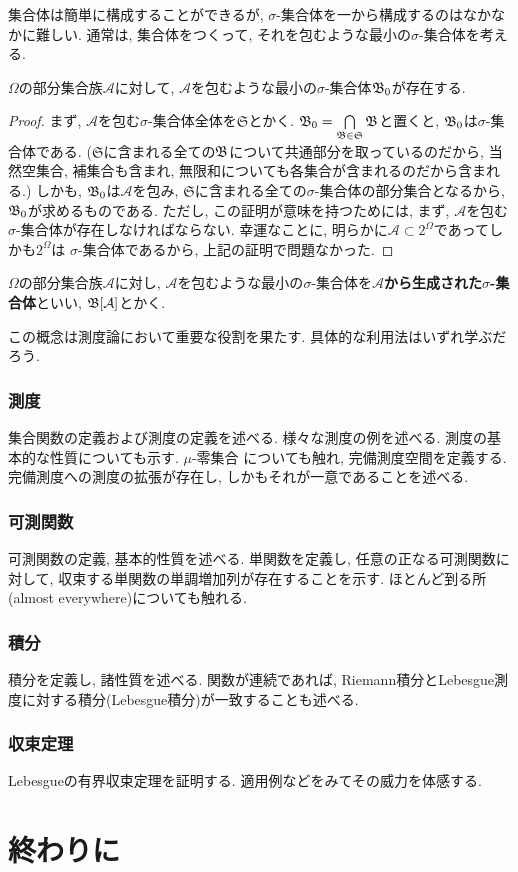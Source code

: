         集合体は簡単に構成することができるが, $\sigma$-集合体を一から構成するのはなかなかに難しい. 通常は, 集合体をつくって, それを包むような最小の$\sigma$-集合体を考える.
        \begin{theorem}
            $\Omega$の部分集合族$\mathcal{A}$に対して, $\mathcal{A}$を包むような最小の$\sigma$-集合体$\mathfrak{B}_0$が存在する.
        \end{theorem}
        \begin{proof}
            まず, $\mathcal{A}$を包む$\sigma$-集合体全体を$\mathfrak{S}$とかく. $\mathfrak{B}_0 = \bigcap\limits_{\mathfrak{B}\in\mathfrak{S}}\mathfrak{B}$と置くと, $\mathfrak{B}_0$は$\sigma$-集合体である.
            ($\mathfrak{S}$に含まれる全ての$\mathfrak{B}$について共通部分を取っているのだから, 当然空集合, 補集合も含まれ, 無限和についても各集合が含まれるのだから含まれる.)
            しかも, $\mathfrak{B}_0$は$\mathcal{A}$を包み, $\mathfrak{S}$に含まれる全ての$\sigma$-集合体の部分集合となるから, $\mathfrak{B}_0$が求めるものである.
            ただし, この証明が意味を持つためには, まず, $\mathcal{A}$を包む$\sigma$-集合体が存在しなければならない. 幸運なことに, 明らかに$\mathcal{A}\subset 2^\Omega$であってしかも$2^\Omega$は
            $\sigma$-集合体であるから, 上記の証明で問題なかった.
        \end{proof}

        \begin{definition}
            $\Omega$の部分集合族$\mathcal{A}$に対し, $\mathcal{A}$を包むような最小の$\sigma$-集合体を$\mathcal{A}$\textbf{から生成された$\sigma$-集合体}といい, $\mathfrak{B}[\mathcal{A}]$とかく.
        \end{definition}

        この概念は測度論において重要な役割を果たす. 具体的な利用法はいずれ学ぶだろう.
        
\clearpage
\section{測度}
    集合関数の定義および測度の定義を述べる. 様々な測度の例を述べる. 測度の基本的な性質についても示す. $\mu$-零集合
    についても触れ, 完備測度空間を定義する. 完備測度への測度の拡張が存在し, しかもそれが一意であることを述べる.
\clearpage
\section{可測関数}
    可測関数の定義, 基本的性質を述べる. 単関数を定義し, 任意の正なる可測関数に対して, 収束する単関数の単調増加列が存在することを示す.
    ほとんど到る所(almost everywhere)についても触れる.
\clearpage
\section{積分}
    積分を定義し, 諸性質を述べる. 関数が連続であれば, Riemann積分とLebesgue測度に対する積分(Lebesgue積分)が一致することも述べる.
\clearpage
\section{収束定理}
    Lebesgueの有界収束定理を証明する. 適用例などをみてその威力を体感する.
\clearpage
\part{終わりに}
\clearpage